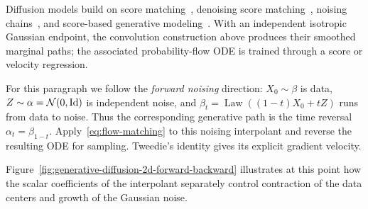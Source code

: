 Diffusion models build on score matching~\cite{Hyvarinen2005ScoreMatching}, denoising score matching~\cite{Vincent2011DenoisingScoreMatching}, noising chains~\cite{SohlDickstein2015DeepUnsupervised,Ho2020DDPM}, and score-based generative modeling~\cite{Song2019ScoreMatchingGenerative,Song2021ScoreSDE}. With an independent isotropic Gaussian endpoint, the convolution construction above produces their smoothed marginal paths; the associated probability-flow ODE is trained through a score or velocity regression.

For this paragraph we follow the \emph{forward noising} direction: $X_0\sim\beta$ is data, $Z\sim\alpha=\mathcal{N}(0,\mathrm{Id})$ is independent noise, and $\beta_t=\operatorname{Law}((1-t)X_0+tZ)$ runs from data to noise. Thus the corresponding generative path is the time reversal $\alpha_t=\beta_{1-t}$. Apply~\eqref{eq:flow-matching} to this noising interpolant and reverse the resulting ODE for sampling. Tweedie's identity gives its explicit gradient velocity.

Figure~\ref{fig:generative-diffusion-2d-forward-backward} illustrates at this point how the scalar coefficients of the interpolant separately control contraction of the data centers and growth of the Gaussian noise.

